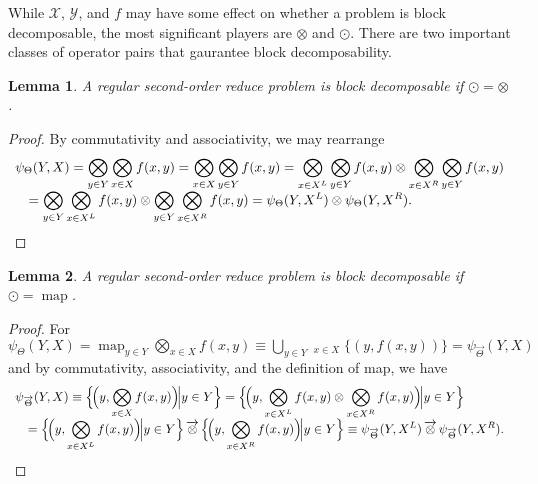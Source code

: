 \documentclass{article}
\newtheorem{lemma}{Lemma}
\newcommand{\GNP}{\psi_{\Theta}}
\DeclareMathOperator*{\map}{map}
\begin{document}
While $\mathcal{X}$, $\mathcal{Y}$, and $f$ may have some effect on
whether a problem is block decomposable, the most significant players
are $\otimes$ and $\odot$.  There are two important classes of
operator pairs that gaurantee block decomposability.
\begin{lemma}
  A regular second-order reduce problem is block decomposable if
  $\odot = \otimes$.
\end{lemma}
\begin{proof}
  By commutativity and associativity, we may rearrange
  \[ \begin{array}{ll}
    \multicolumn{2}{l}{\displaystyle \GNP(Y,X) = \bigotimes_{y \in Y} \bigotimes_{x \in X} f(x,y) = \bigotimes_{x \in X} \bigotimes_{y \in Y} f(x,y) = \bigotimes_{x \in X^L} \bigotimes_{y \in Y} f(x,y) \otimes \bigotimes_{x \in X^R} \bigotimes_{y \in Y} f(x,y)} \\
    & \displaystyle = \bigotimes_{y \in Y} \bigotimes_{x \in X^L} f(x,y) \otimes \bigotimes_{y \in Y} \bigotimes_{x \in X^R} f(x,y) = \GNP(Y,X^L) \otimes \GNP(Y,X^R).
  \end{array} \]
\end{proof}
\begin{lemma}\label{lem:map}
  A regular second-order reduce problem is block decomposable if
  $\odot = \map$.
\end{lemma}
\begin{proof}
  For $\psi_{\Theta}(Y,X) = \map_{y \in Y} \bigotimes_{x \in X} f(x,y)
  \equiv \bigcup_{y \in Y} \mathop{\overrightarrow{\bigotimes}}_{x \in
  X} \{(y,f(x,y))\} = \psi_{\overrightarrow{\Theta}}(Y,X)$ and by
  commutativity, associativity, and the definition of map, we have
  \[ \begin{array}{ll}
    \multicolumn{2}{l}{\displaystyle \psi_{\overrightarrow{\Theta}}(Y,X) \equiv \Big\{ \!\Big( y,\bigotimes_{x \in X} f(x,y) \Big)\! \Big| y \in Y \Big\} = \Big\{ \!\Big( y,\bigotimes_{x \in X^L} f(x,y) \otimes \bigotimes_{x \in X^R} f(x,y) \Big)\! \Big| y \in Y \Big\}} \\
    & \displaystyle = \Big\{ \!\Big( y,\bigotimes_{x \in X^L} f(x,y) \Big)\! \Big| y \in Y \Big\} \mathop{\overrightarrow{\otimes}}\nolimits \Big\{ \!\Big( y,\bigotimes_{x \in X^R} f(x,y) \Big)\! \Big| y \in Y \Big\} \equiv \psi_{\overrightarrow{\Theta}}(Y,X^L) \mathop{\overrightarrow{\otimes}}\nolimits \psi_{\overrightarrow{\Theta}}(Y,X^R).
  \end{array} \]
\end{proof}
\end{document}
